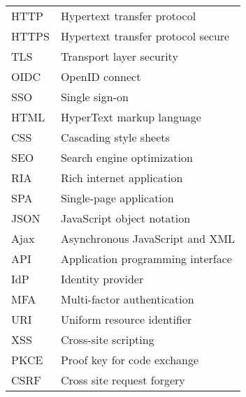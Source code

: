 
\begin{tabular}{ll}
HTTP       & Hypertext transfer protocol \\
HTTPS      & Hypertext transfer protocol secure \\
TLS        & Transport layer security \\
OIDC       & OpenID connect \\
SSO        & Single sign-on \\
HTML       & HyperText markup language \\
CSS        & Cascading style sheets \\
SEO        & Search engine optimization \\
RIA        & Rich internet application \\
SPA        & Single-page application \\
JSON       & JavaScript object notation \\
Ajax       & Asynchronous JavaScript and XML \\
API        & Application programming interface \\
IdP        & Identity provider \\
MFA        & Multi-factor authentication \\
URI        & Uniform resource identifier \\
XSS        & Cross-site scripting \\
PKCE       & Proof key for code exchange \\
CSRF       & Cross site request forgery 

\end{tabular}


\cleardoublepage

